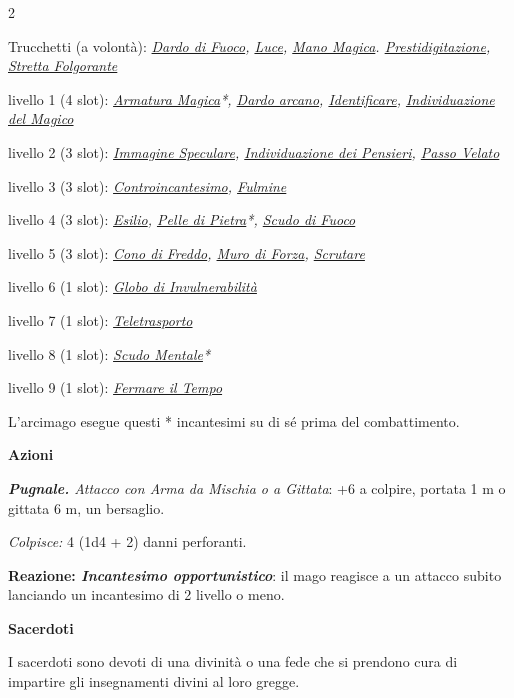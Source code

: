 \begin{multicols}{2}
{Trucchetti (a volontà): \emph{\hyperlink{Dardo di Fuoco}{Dardo di Fuoco}, \hyperlink{Luce}{Luce}, \hyperlink{Mano Magica}{Mano Magica}. \hyperlink{Prestidigitazione}{Prestidigitazione}, \hyperlink{Stretta Folgorante}{Stretta Folgorante}}

livello 1 (4 slot): \emph{\hyperlink{Armatura Magica}{Armatura Magica}*, \hyperlink{Dardo arcano}{Dardo arcano}, \hyperlink{Identificare}{Identificare}, \hyperlink{Individuazione del Magico}{Individuazione del Magico}}

livello 2 (3 slot): \emph{\hyperlink{Immagine Speculare}{Immagine Speculare}, \hyperlink{Individuazione dei Pensieri}{Individuazione dei Pensieri}, \hyperlink{Passo Velato}{Passo Velato}}

livello 3 (3 slot): \emph{\hyperlink{Controincantesimo}{Controincantesimo}, \hyperlink{Fulmine}{Fulmine}}

livello 4 (3 slot): \emph{\hyperlink{Esilio}{Esilio}, \hyperlink{Pelle di Pietra}{Pelle di Pietra}*, \hyperlink{Scudo di Fuoco}{Scudo di Fuoco}}

livello 5 (3 slot): \emph{\hyperlink{Cono di Freddo}{Cono di Freddo}, \hyperlink{Muro di Forza}{Muro di Forza}, \hyperlink{Scrutare}{Scrutare}}

livello 6 (1 slot): \emph{\hyperlink{Globo di Invulnerabilità}{Globo di Invulnerabilità}}

livello 7 (1 slot): \emph{\hyperlink{Teletrasporto}{Teletrasporto}}

livello 8 (1 slot): \emph{\hyperlink{Scudo Mentale}{Scudo Mentale}*}

livello 9 (1 slot): \emph{\hyperlink{Fermare il Tempo}{Fermare il Tempo}}

L'arcimago esegue questi * incantesimi su di sé prima del combattimento.

\textbf{Azioni}

\emph{\textbf{Pugnale.} Attacco con Arma da Mischia o a Gittata}: +6 a colpire, portata 1 m o gittata 6 m, un bersaglio.

\emph{Colpisce:} 4 (1d4 + 2) danni perforanti.

\textbf{Reazione: \emph{Incantesimo opportunistico}}: il mago reagisce a un attacco subito lanciando un incantesimo di 2 livello o meno.

\medskip\textbf{Sacerdoti}

I sacerdoti sono devoti di una divinità o una fede che si prendono cura di impartire gli insegnamenti divini al loro gregge.

}
\end{multicols}

